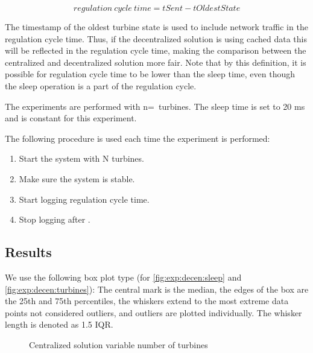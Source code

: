 $$regulation~cycle~time=tSent-tOldestState$$

The timestamp of the oldest turbine state is used to include network traffic in the regulation cycle time. Thus, if the decentralized solution is using cached data this will be reflected in the regulation cycle time, making the comparison between the centralized and decentralized solution more fair. Note that by this definition, it is possible for regulation cycle time to be lower than the sleep time, even though the sleep operation is a part of the regulation cycle. 

The experiments are performed with n=\testTurbineNumbers ~turbines. The sleep time is set to 20 ms and is constant for this experiment.

The following procedure is used each time the experiment is performed:

\begin{minipage}{\textwidth}
	\begin{enumerate}
		\item Start the system with N turbines.
		\item Make sure the system is stable.
		\item Start logging regulation cycle time.
		\item Stop logging after \experiemntRunTime.
		\end{enumerate}
\end{minipage}

\subsection{Results}

We use the following box plot type (for \cref{fig:exp:decen:sleep} and \cref{fig:exp:decen:turbines}): The central mark is the median, the edges of the box are the 25th and 75th percentiles, the whiskers extend to the most extreme data points not considered outliers, and outliers are plotted individually. The whisker length is denoted as 1.5 IQR. 

\begin{figure}[h!]
	\centering
%	
%	
	
	
	\caption{Centralized solution variable number of turbines}
	\label{fig:exp:cen:turbines}
\end{figure}

